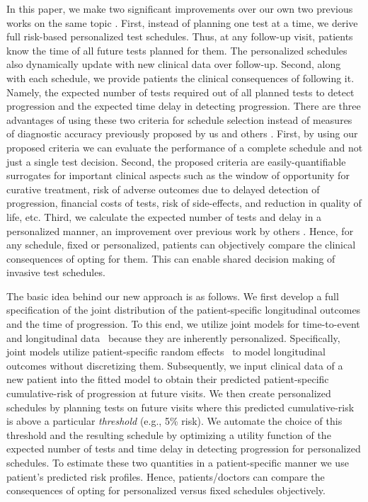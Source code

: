 \documentclass[AMA,STIX1COL]{WileyNJD-v2}
\begin{document}
In this paper, we make two significant improvements over our own two previous works on the same topic \citep{tomer2019personalizedbiometrics,tomer2019personalized}. First, instead of planning one test at a time, we derive full risk-based personalized test schedules. Thus, at any follow-up visit, patients know the time of all future tests planned for them. The personalized schedules also dynamically update with new clinical data over follow-up. Second, along with each schedule, we provide patients the clinical consequences of following it. Namely, the expected number of tests required out of all planned tests to detect progression and the expected time delay in detecting progression. There are three advantages of using these two criteria for schedule selection instead of measures of diagnostic accuracy previously proposed by us \citep{tomer2019personalized} and others \citep{wang2019learning}. First, by using our proposed criteria we can evaluate the performance of a complete schedule and not just a single test decision. Second, the proposed criteria are easily-quantifiable surrogates for important clinical aspects such as the window of opportunity for curative treatment, risk of adverse outcomes due to delayed detection of progression, financial costs of tests, risk of side-effects, and reduction in quality of life, etc. Third, we calculate the expected number of tests and delay in a personalized manner, an improvement over previous work by others \citep{bebu2017optimal}. Hence, for any schedule, fixed or personalized, patients can objectively compare the clinical consequences of opting for them. This can enable shared decision making of invasive test schedules.

The basic idea behind our new approach is as follows. We first develop a full specification of the joint distribution of the patient-specific longitudinal outcomes and the time of progression. To this end, we utilize joint models for time-to-event and longitudinal data~\citep{tsiatis2004joint,rizopoulos2012joint} because they are inherently personalized. Specifically, joint models utilize patient-specific random effects~\citep{mcculloch2005generalized} to model longitudinal outcomes without discretizing them. Subsequently, we input clinical data of a new patient into the fitted model to obtain their predicted patient-specific cumulative-risk of progression at future visits. We then create personalized schedules by planning tests on future visits where this predicted cumulative-risk is above a particular \emph{threshold} (e.g., 5\% risk). We automate the choice of this threshold and the resulting schedule by optimizing a utility function of the expected number of tests and time delay in detecting progression for personalized schedules. To estimate these two quantities in a patient-specific manner we use patient's predicted risk profiles. Hence, patients/doctors can compare the consequences of opting for personalized versus fixed schedules objectively.
\end{document}
